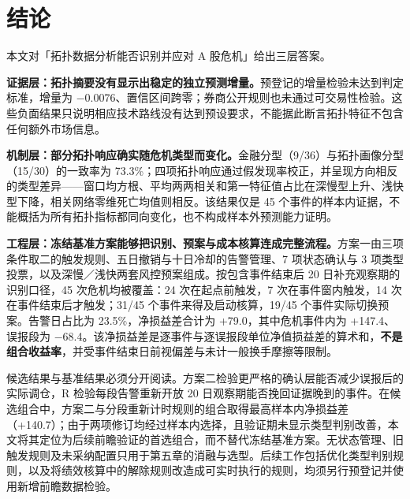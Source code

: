 \documentclass[12pt,a4paper]{ctexart}
\begin{document}
\section{结论}
本文对「拓扑数据分析能否识别并应对 A 股危机」给出三层答案。\par
\textbf{证据层：拓扑摘要没有显示出稳定的独立预测增量。}预登记的增量检验未达到判定标准，增量为 \(-\)0.0076、置信区间跨零；券商公开规则也未通过可交易性检验。这些负面结果只说明相应技术路线没有达到预设要求，不能据此断言拓扑特征不包含任何额外市场信息。\par
\textbf{机制层：部分拓扑响应确实随危机类型而变化。}金融分型（9/36）与拓扑画像分型（15/30）的一致率为 73.3\%；四项拓扑响应通过假发现率校正，并呈现方向相反的类型差异——窗口均方根、平均两两相关和第一特征值占比在深慢型上升、浅快型下降，相关网络零维死亡均值则相反。该结果仅是 45 个事件的样本内证据，不能概括为所有拓扑指标都同向变化，也不构成样本外预测能力证明。\par
\textbf{工程层：冻结基准方案能够把识别、预案与成本核算连成完整流程。}方案一由三项条件取二的触发规则、五日撤销与十日冷却的告警管理、7 项状态确认与 3 项类型投票，以及深慢／浅快两套风控预案组成。按包含事件结束后 20 日补充观察期的识别口径，45 次危机均被覆盖：24 次在起点前触发，7 次在事件窗内触发，14 次在事件结束后才触发；31/45 个事件来得及启动核算，19/45 个事件实际切换预案。告警日占比为 23.5\%，净损益差合计为 +79.0，其中危机事件内为 +147.4、误报段为 \(-\)68.4。该净损益差是逐事件与逐误报段单位净值损益差的算术和，\textbf{不是组合收益率}，并受事件结束日前视偏差与未计一般换手摩擦等限制。\par
候选结果与基准结果必须分开阅读。方案二检验更严格的确认层能否减少误报后的实际调仓，R 检验每段告警重新开放 20 日观察期能否挽回证据晚到的事件。在候选组合中，方案二与分段重新计时规则的组合取得最高样本内净损益差（+140.7）；由于两项修订均经过样本内选择，且验证期未显示类型判别改善，本文将其定位为后续前瞻验证的首选组合，而不替代冻结基准方案。无状态管理、旧触发规则及未采纳配置只用于第五章的消融与选型。后续工作包括优化类型判别规则，以及将绩效核算中的解除规则改造成可实时执行的规则，均须另行预登记并使用新增前瞻数据检验。\par
\end{document}
